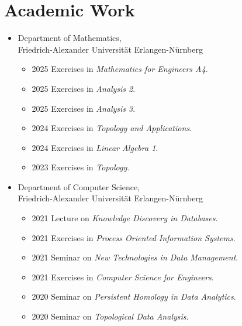 \documentclass[a4paper, 11pt]{article}
\newcommand{\years}[1]{\marginnote{\scriptsize #1}}
\begin{document}
	\section*{Academic Work}
	\years{Teaching}
	\vspace{-2pt}
	\begin{itemize}[noitemsep, leftmargin=*]
		\item Department of Mathematics, \\ Friedrich-Alexander Universität Erlangen-Nürnberg
			\begin{itemize}
				\item 2025 Exercises in \emph{Mathematics for Engineers A4}.

				\item 2025 Exercises in \emph{Analysis 2}.

				\item 2025 Exercises in \emph{Analysis 3}.

				\item 2024 Exercises in \emph{Topology and Applications}.

				\item 2024 Exercises in \emph{Linear Algebra 1}.

				\item 2023 Exercises in \emph{Topology}.
			\end{itemize}

		\item Department of Computer Science, \\ Friedrich-Alexander Universität
			Erlangen-Nürnberg
			\begin{itemize}
				\item 2021 Lecture on \emph{Knowledge Discovery in Databases}.

				\item 2021 Exercises in \emph{Process Oriented Information Systems}.

				\item 2021 Seminar on \emph{New Technologies in Data Management}.

				\item 2021 Exercises in \emph{Computer Science for Engineers}.

				\item 2020 Seminar on \emph{Persistent Homology in Data Analytics}.

				\item 2020 Seminar on \emph{Topological Data Analysis}.


\end{itemize}
\end{itemize}
\end{document}
